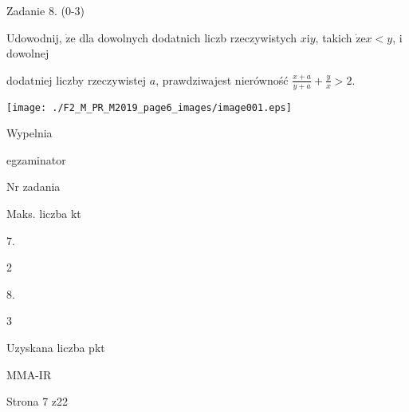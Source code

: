 \documentclass[a4paper,12pt]{article}
\begin{document}
Zadanie 8. (0-3)

Udowodnij, $\dot{\mathrm{z}}\mathrm{e}$ dla dowolnych dodatnich liczb rzeczywistych $x\mathrm{i}y$, takich $\dot{\mathrm{z}}\mathrm{e}x<y$, i dowolnej

dodatniej liczby rzeczywistej $a$, prawdziwajest nierówność $\displaystyle \frac{x+a}{y+a}+\frac{y}{x}>2.$
\begin{center}
\texttt{[image: ./F2\_M\_PR\_M2019\_page6\_images/image001.eps]}
\end{center}
Wypelnia

egzaminator

Nr zadania

Maks. liczba kt

7.

2

8.

3

Uzyskana liczba pkt

MMA-IR

Strona 7 z22
\end{document}

